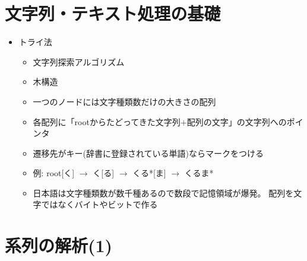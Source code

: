 \documentclass[a4j,11pt]{jsarticle}
\begin{document}
\setcounter{section}{1}
\section{文字列・テキスト処理の基礎}
\begin{itemize}
 \item トライ法
       \begin{itemize}
	\item 文字列探索アルゴリズム
	\item 木構造
	\item 一つのノードには文字種類数だけの大きさの配列
	\item 各配列に「rootからたどってきた文字列$+$配列の文字」の文字列へのポインタ
	\item 遷移先がキー(辞書に登録されている単語)ならマークをつける
	\item 例: root[く] $\rightarrow$ く[る] $\rightarrow$ くる*[ま] $\rightarrow$ くるま*
	\item 日本語は文字種類数が数千種あるので数段で記憶領域が爆発。
	      配列を文字ではなくバイトやビットで作る
       \end{itemize}
\end{itemize}

\section{系列の解析(1)}
\end{document}
